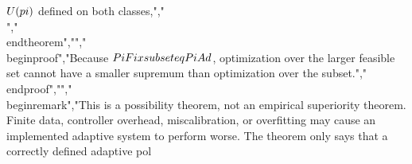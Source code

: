 {{{ $U(\\pi)$ defined on both classes,","\\[","\\sup_{\\pi\\in\\PiAd}U(\\pi)","\\ge","\\sup_{\\pi\\in\\PiFix}U(\\pi).","\\]","\\end{theorem}","","\\begin{proof}","Because $\\PiFix\\subseteq\\PiAd$, optimization over the larger feasible set cannot have a smaller supremum than optimization over the subset.","\\end{proof}","","\\begin{remark}","This is a possibility theorem, not an empirical superiority theorem. Finite data, controller overhead, miscalibration, or overfitting may cause an implemented adaptive system to perform worse. The theorem only says that a correctly defined adaptive pol}}}
